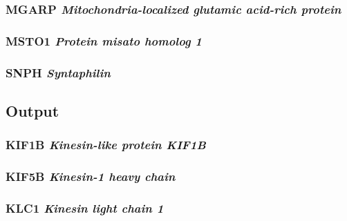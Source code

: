 \subsubsection{MGARP \textit{Mitochondria-localized glutamic acid-rich protein}}

\subsubsection{MSTO1 \textit{Protein misato homolog 1}}

\subsubsection{SNPH \textit{Syntaphilin}}

\subsection{Output}

\subsubsection{KIF1B \textit{Kinesin-like protein KIF1B}}

\subsubsection{KIF5B \textit{Kinesin-1 heavy chain}}

\subsubsection{KLC1 \textit{Kinesin light chain 1}}





